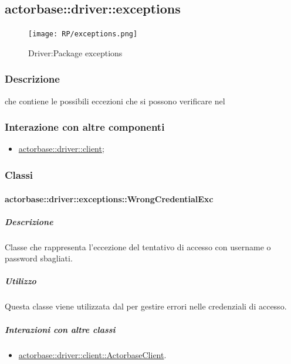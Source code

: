 \documentclass{scalatekids-article}
\begin{document}

\subsection{actorbase::driver::exceptions}
\label{sec:actorbase::driver::exceptions}

\begin{figure}[H]
  \begin{center}
    \texttt{[image: RP/exceptions.png]}
    \caption{Driver:Package exceptions}
  \end{center}
\end{figure}

\subsubsection{Descrizione}

 che contiene le possibili eccezioni che si possono verificare nel 

\subsubsection{Interazione con altre componenti}
\begin{itemize}
\item \hyperref[sec:actorbase::driver::client]{actorbase::driver::client};
\end{itemize}

\subsubsection{Classi}

\paragraph{actorbase::driver::exceptions::WrongCredentialExc}

\subparagraph{Descrizione}

Classe che rappresenta l'eccezione del tentativo di accesso con username o password sbagliati.

\subparagraph{Utilizzo}

Questa classe viene utilizzata dal  per gestire errori nelle credenziali di accesso.

\subparagraph{Interazioni con altre classi}

\begin{itemize}
\item \hyperref[sec:actorbase::driver::client::ActorbaseClient]{actorbase::driver::client::ActorbaseClient}.
\end{itemize}
\end{document}
